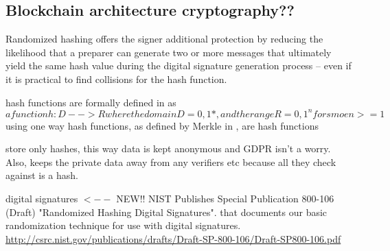 \subsection{Blockchain architecture cryptography??}
Randomized hashing offers the signer additional protection by reducing the likelihood that a preparer can generate two or more messages 
that ultimately yield the same hash value during the digital signature generation process – even if it is practical to find collisions for the hash function. 

hash functions are formally defined in \cite{rompay_analysis_nodate} as $a function h: D --> R where the domain D = {0,1}*, and the range R = {0,1}^n for smoe n >= 1 $
using one way hash functions, as defined by Merkle in \cite{merkle_secrecy_1979}, are hash functions

store only hashes, this way data is kept anonymous and GDPR isn't a worry. Also, keeps the private data away from any verifiers etc because all they check against is a hash. %

digital signatures  $<--$ NEW!! NIST Publishes Special Publication 800-106 (Draft) "Randomized Hashing Digital Signatures". that documents our basic randomization technique for use with digital signatures. \url{http://csrc.nist.gov/publications/drafts/Draft-SP-800-106/Draft-SP800-106.pdf}
